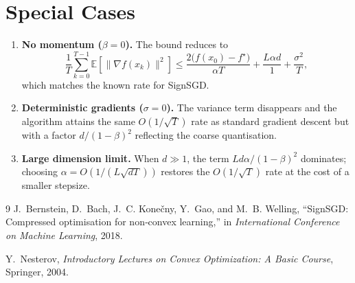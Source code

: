 \documentclass{article}
\newcommand{\E}{\mathbb{E}}
\begin{document}
\section*{Special Cases}
\begin{enumerate}[label=\arabic*.]
    \item \textbf{No momentum ($\beta=0$).} The bound reduces to
    \[
    \frac{1}{T}\sum_{k=0}^{T-1}\E[\|\nabla f(x_k)\|^{2}]
    \le
    \frac{2\big(f(x_0)-f^{\star}\big)}{\alpha T}
    +\frac{L\alpha d}{1}
    +\frac{\sigma^{2}}{T},
    \]
    which matches the known rate for SignSGD.
    \item \textbf{Deterministic gradients ($\sigma=0$).} The variance term disappears and the algorithm attains the same $O(1/\sqrt{T})$ rate as standard gradient descent but with a factor $d/(1-\beta)^{2}$ reflecting the coarse quantisation.
    \item \textbf{Large dimension limit.} When $d\gg 1$, the term $Ld\alpha/(1-\beta)^{2}$ dominates; choosing $\alpha=O(1/(L\sqrt{dT}))$ restores the $O(1/\sqrt{T})$ rate at the cost of a smaller stepsize.
\end{enumerate}

\begin{thebibliography}{9}
J.~Bernstein, D.~Bach, J.~C. Konečny, Y.~Gao, and M.~B. Welling,
\newblock ``SignSGD: Compressed optimisation for non‑convex learning,''
\newblock in \emph{International Conference on Machine Learning}, 2018.

Y.~Nesterov,
\newblock \emph{Introductory Lectures on Convex Optimization: A Basic Course},
\newblock Springer, 2004.
\end{thebibliography}
\end{document}

